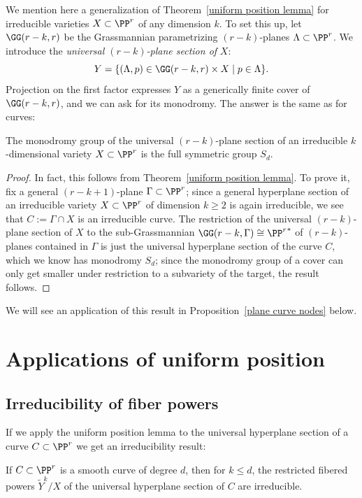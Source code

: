 We mention here a generalization of Theorem~\ref{uniform position lemma} for irreducible varieties $X \subset \PP^r$ of any dimension $k$. To set this up, let $\GG(r-k,r)$ be the Grassmannian parametrizing $(r-k)$-planes $\Lambda \subset \PP^r$. We introduce the \emph{universal $(r-k)$-plane section of} $X$:
$$
Y = \{ (\Lambda, p) \in \GG(r-k,r) \times X \mid p \in \Lambda \}.
$$
Projection on the first factor expresses $Y$ as a generically finite cover of $\GG(r-k,r)$, and we can ask for its monodromy. The answer is the same as for curves: 


\begin{theorem}\label{higher dim uniform position lemma}
The monodromy group of the universal $(r-k)$-plane section of an irreducible $k$-dimensional variety $X \subset \PP^r$ is the full symmetric group $S_d$.
\end{theorem}

\begin{proof}
In fact, this follows from Theorem~\ref{uniform position lemma}. To prove it, fix a general $(r-k+1)$-plane $\Gamma \subset \PP^r$; since a general hyperplane section of an irreducible variety $X \subset \PP^r$ of dimension $k \geq 2$ is again irreducible, we see that $C := \Gamma \cap X$ is an irreducible curve. The restriction of the universal $(r-k)$-plane section of $X$ to the sub-Grassmannian $\GG(r-k, \Gamma) \cong {\PP^r}^*$ of $(r-k)$-planes contained in $\Gamma$ is just the universal hyperplane section of the curve $C$, which we know has monodromy $S_d$; since the monodromy group of a cover can only get smaller under restriction to a subvariety of the target, the result follows.
\end{proof}

We will see an application of this result in Proposition~\ref{plane curve nodes} below.

 \section{Applications of uniform position}
\subsection{Irreducibility of fiber powers}
If we apply the uniform position lemma to the universal hyperplane section of a curve $C \subset \PP^r$ we get an irreducibility result:

\begin{corollary}\label{hyperplane section monodromy} If $C\subset \PP^r$ is a smooth curve of degree $d$, then 
for $k\leq d$, the restricted fibered powers $\tilde Y^k/X$  of the universal hyperplane section 
of $C$ are irreducible.
\end{corollary}

